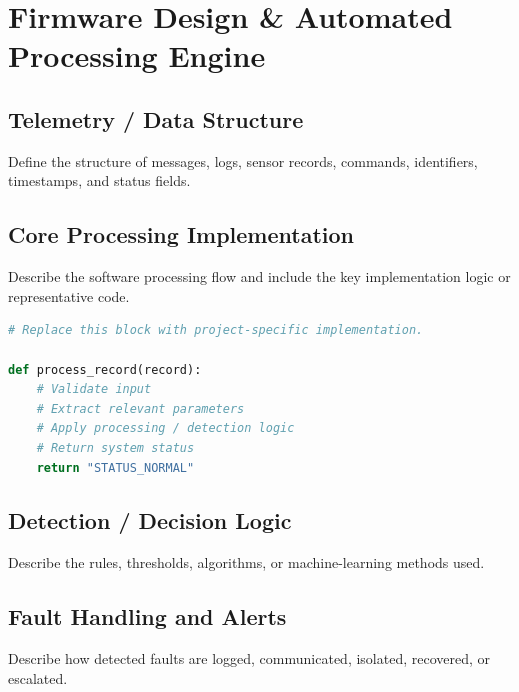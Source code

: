 
\section{Firmware Design \& Automated Processing Engine}

\subsection{Telemetry / Data Structure}

Define the structure of messages, logs, sensor records, commands,
identifiers, timestamps, and status fields.

\subsection{Core Processing Implementation}

Describe the software processing flow and include the key implementation
logic or representative code.

\begin{lstlisting}[language=Python, caption=Example Processing / Monitoring Loop]
# Replace this block with project-specific implementation.

def process_record(record):
    # Validate input
    # Extract relevant parameters
    # Apply processing / detection logic
    # Return system status
    return "STATUS_NORMAL"
\end{lstlisting}

\subsection{Detection / Decision Logic}

Describe the rules, thresholds, algorithms, or machine-learning methods used.

\subsection{Fault Handling and Alerts}

Describe how detected faults are logged, communicated, isolated,
recovered, or escalated.
